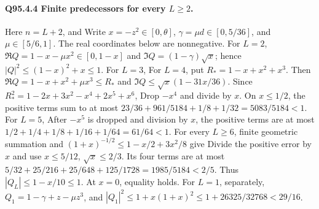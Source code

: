 \paragraph{Q95.4.4 Finite predecessors for every \(L\ge\allowbreak 2\).}
Here \(n=\allowbreak L+2\), and
Write \(x=\allowbreak -z^2\in[0,\allowbreak \theta]\), \(\gamma=\allowbreak \mu d\in[0,\allowbreak 5/36]\),
and \(\mu\in[5/6,\allowbreak 1]\). The real coordinates below are nonnegative.
For \(L=\allowbreak 2\),
\(\Re Q=\allowbreak 1-x-\mu x^2\in[0,\allowbreak 1-x]\) and
\(\Im Q=\allowbreak (1-\gamma)\sqrt x\); hence
\(|Q|^2\le\allowbreak (1-x)^2+x\le\allowbreak 1\).
For \(L=\allowbreak 3\),
For \(L=\allowbreak 4\), put \(R_*=\allowbreak 1-x+x^2+x^3\). Then
\(\Re Q=\allowbreak 1-x+x^2+\mu x^3\le\allowbreak  R_*\) and
\(\Im Q\le\allowbreak \sqrt x(1-31x/36)\).
Since \(R_*^2=\allowbreak 1-2x+3x^2-x^4+2x^5+x^6\),
Drop \(-x^4\) and divide by \(x\). On \(x\le\allowbreak 1/2\), the positive
terms sum to at most \(23/36+961/5184+1/8+1/32=\allowbreak 5083/5184<\allowbreak 1\).
For \(L=\allowbreak 5\),
After \(-x^5\) is dropped and division by \(x\), the positive terms
are at most \(1/2+1/4+1/8+1/16+1/64=\allowbreak 61/64<\allowbreak 1\).
For every \(L\ge\allowbreak 6\), finite geometric summation and
\((1+x)^{-1/2}\le\allowbreak 1-x/2+3x^2/8\) give
Divide the positive error by \(x\) and use \(x\le\allowbreak 5/12\),
\(\sqrt x\le\allowbreak 2/3\). Its four terms are at most
\(5/32+25/216+25/648+125/1728=\allowbreak 1985/5184<\allowbreak 2/5\).
Thus \(|Q_L|\le\allowbreak 1-x/10\le\allowbreak 1\). At \(x=\allowbreak 0\), equality holds.
For \(L=\allowbreak 1\), separately, \(Q_1=\allowbreak 1-\gamma+z-\mu z^3\), and
\(|Q_1|^2\le\allowbreak 1+x(1+x)^2\le\allowbreak 1+26325/32768<\allowbreak 29/16\).

